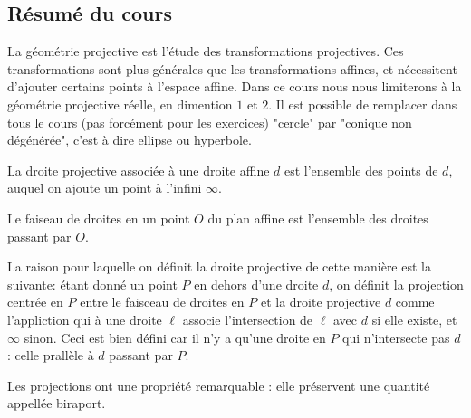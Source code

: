 
\subsection*{Résumé du cours}

La géométrie projective est l'étude des transformations projectives. Ces transformations sont plus générales que les transformations affines, et nécessitent d'ajouter certains points à l'espace affine. Dans ce cours nous nous limiterons à la géométrie projective réelle, en dimention $1$ et $2$. Il est possible de remplacer dans tous le cours (pas forcément pour les exercices) "cercle" par "conique non dégénérée", c'est à dire ellipse ou hyperbole.


\begin{defn}
La droite projective associée à une droite affine $d$ est l'ensemble des points de $d$, auquel on ajoute un point à l'infini $\infty$.

\medskip

Le faiseau de droites en un point $O$ du plan affine est l'ensemble des droites passant par $O$.
\end{defn}

La raison pour laquelle on définit la droite projective de cette manière est la suivante: étant donné un point $P$ en dehors d'une droite $d$, on définit la projection centrée en $P$ entre le faisceau de droites en $P$ et la droite projective $d$ comme l'appliction qui à une droite $\ell$ associe l'intersection de $\ell$ avec $d$ si elle existe, et $\infty$ sinon. Ceci est bien défini car il n'y a qu'une droite en $P$ qui n'intersecte pas $d$: celle prallèle à $d$ passant par $P$.

\medskip

Les projections ont une propriété remarquable : elle préservent une quantité appellée biraport.

